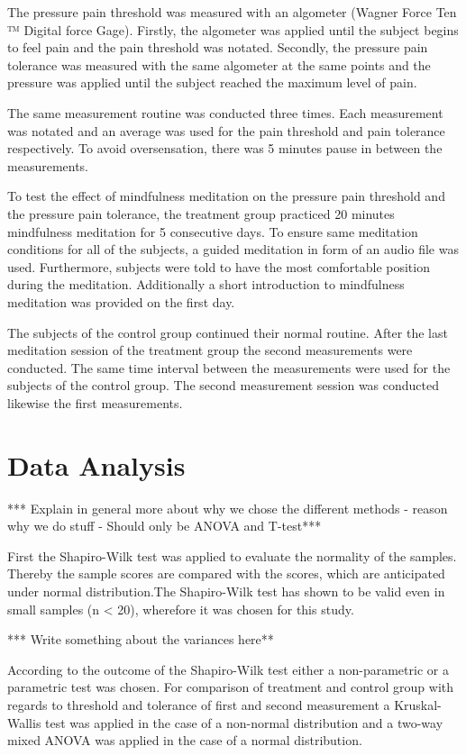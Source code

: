The pressure pain threshold was measured with an algometer (Wagner Force Ten ™  Digital force Gage). Firstly, the algometer was applied until the subject begins to feel pain and the pain threshold was notated. Secondly, the pressure pain tolerance was measured with the same algometer at the same points and the pressure was applied until the subject reached the maximum level of pain.

The same measurement routine was conducted three times. Each measurement was notated and an average was used for the pain threshold and pain tolerance respectively. To avoid oversensation, there was 5 minutes pause in between the measurements. 

To test the effect of mindfulness meditation on the pressure pain threshold and the pressure pain tolerance, the treatment group practiced 20 minutes mindfulness meditation for 5 consecutive days. To ensure same meditation conditions for all of the subjects, a guided meditation in form of an audio file was used. Furthermore, subjects were told to have the most comfortable position during the meditation.  Additionally a short introduction to mindfulness meditation was provided on the first day. 

The subjects of the control group continued their normal routine.
After the last meditation session of the treatment group the second measurements were conducted. The same time interval between the measurements were used for the subjects of the control group. The second measurement session was conducted likewise the first measurements.


\section{Data Analysis}
*** Explain in general more about why we chose the different methods - reason why we do stuff - Should only be ANOVA and T-test*** 

First the Shapiro-Wilk test was applied to evaluate the normality of the samples. Thereby the sample scores are compared with the scores, which are anticipated under normal distribution.The Shapiro-Wilk test has shown to be valid even in small samples (n < 20), wherefore it was chosen for this study. \cite{Shapiro1965,Mooi2018} 

*** Write something about the variances here**

According to the outcome of the Shapiro-Wilk test either a non-parametric or a parametric test was chosen.
For comparison of treatment and control group with regards to threshold and tolerance of first and second measurement a Kruskal-Wallis test was applied in the case of a non-normal distribution and a two-way mixed ANOVA was applied in the case of a normal distribution.

